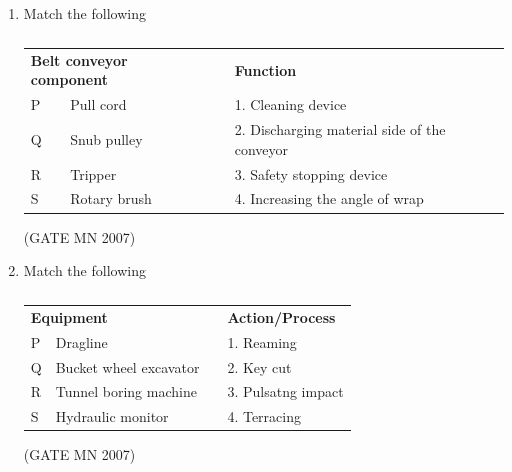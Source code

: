 \documentclass[journal]{IEEEtran}
\begin{document}
\begin{enumerate}
\item Match the following
\begin{table}[H]
    \centering\normalsize
\begin{tabular}{llcl}
\multicolumn{2}{l}{\textbf{Belt conveyor component}} & & \textbf{Function} \\
P & Pull cord      &  & 1. Cleaning device \\
Q & Snub pulley    &  & 2. Discharging material side of the conveyor \\
R & Tripper        &  & 3. Safety stopping device \\
S & Rotary brush   &  & 4. Increasing the angle of wrap \\
\end{tabular}
\caption*{}
    \label{tab:Q32}
\end{table}

\hfill (GATE MN 2007)

\begin{enumerate}
\end{enumerate}




\item Match the following
\begin{table}[H]
    \centering\normalsize
\begin{tabular}{llcl}                             
\multicolumn{2}{l}{\textbf{Equipment  }} & & \textbf{Action/Process} \\
P & Dragline       &  & 1. Reaming \\ 
Q & Bucket wheel excavator    &  & 2. Key cut \\                     
R & Tunnel boring machine   &  & 3. Pulsatng impact    \\                                                
S & Hydraulic monitor   &  & 4. Terracing \\                                       
\end{tabular}
\caption*{}
    \label{tab:Q33}
\end{table}
\hfill (GATE MN 2007)
\begin{enumerate}
\end{enumerate}




\end{enumerate}
\end{document}
